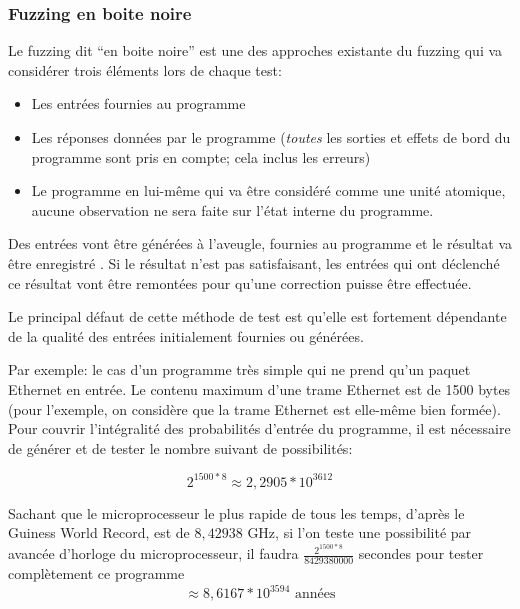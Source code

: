 \documentclass[a4paper]{report}
\begin{document}

\subsubsection{Fuzzing en boite noire}

Le fuzzing dit “en boite noire” est une des approches existante du fuzzing qui va considérer trois éléments lors de chaque test:
\begin{itemize}
\item Les entrées fournies au programme
\item Les réponses données par le programme (\textit{toutes} les sorties et effets de bord du programme sont pris en compte; cela inclus les erreurs)
\item Le programme en lui-même qui va être considéré comme une unité atomique, aucune observation ne sera faite sur l'état interne du programme.
\end{itemize}
Des entrées vont être générées à l'aveugle, fournies au programme et le résultat va être enregistré \cite{Forrester2000}.
Si le résultat n'est pas satisfaisant, les entrées qui ont déclenché ce résultat vont être remontées pour qu'une correction puisse être effectuée.

Le principal  défaut de cette méthode de test est qu'elle est fortement dépendante de la qualité des entrées initialement fournies ou générées. 

Par exemple: le cas d'un programme très simple qui ne prend qu'un paquet Ethernet en entrée.
Le contenu maximum d'une trame Ethernet est de 1500 bytes (pour l'exemple, on considère que la trame Ethernet est elle-même bien formée).
Pour couvrir l'intégralité des probabilités d'entrée du programme, il est nécessaire de générer et de tester le nombre suivant de possibilités:

$$2^{1500 * 8} \approx 2,2905 * 10^{3612}$$

Sachant que le microprocesseur le plus rapide de tous les temps, d'après le Guiness World Record, est de $8,42938$ GHz\cite{gwrcpu}, si l'on teste une possibilité par avancée d'horloge du microprocesseur, il faudra $\frac{2^{1500*8}}{ 8429380000}$ secondes pour tester complètement ce programme
$$\approx 8,6167 * 10^{3594} \text{ années}$$
\end{document}
